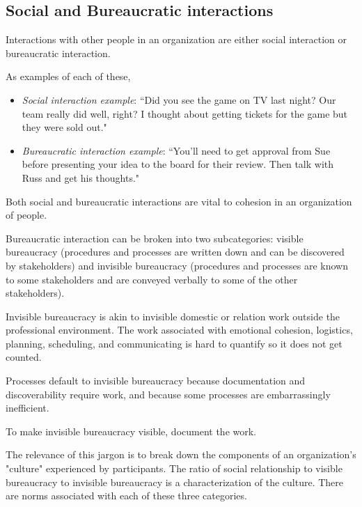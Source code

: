 
\subsection{Social and Bureaucratic interactions}

Interactions with other people in an organization are either social interaction or bureaucratic interaction. 

As examples of each of these,
\begin{itemize}
\item \textit{Social interaction example}: ``Did you see the game on TV last night? Our team really did well, right? I thought about getting tickets for the game but they were sold out."
\item \textit{Bureaucratic interaction example}: ``You'll need to get approval from Sue before presenting your idea to the board for their review. Then talk with Russ and get his thoughts."
\end{itemize}
Both social and bureaucratic interactions are vital to cohesion in an organization of people. 


Bureaucratic interaction can be broken into two subcategories: \gls{visible bureaucracy} (procedures and processes are written down and can be discovered by stakeholders)  and \gls{invisible bureaucracy} (procedures and processes are known to some stakeholders and are conveyed verbally to some of the other stakeholders).

Invisible bureaucracy is akin to invisible domestic or relation work outside the professional environment. The work associated with emotional cohesion, logistics, planning, scheduling, and communicating is hard to quantify so it does not get counted.

Processes default to invisible bureaucracy because documentation and discoverability require work, and because some processes are embarrassingly inefficient. 

To make invisible bureaucracy visible, document the work.


The relevance of this jargon is to break down the components of an organization's "culture" experienced by participants. The ratio of social relationship to visible bureaucracy to invisible bureaucracy is a characterization of the culture. There are norms associated with each of these three categories.

